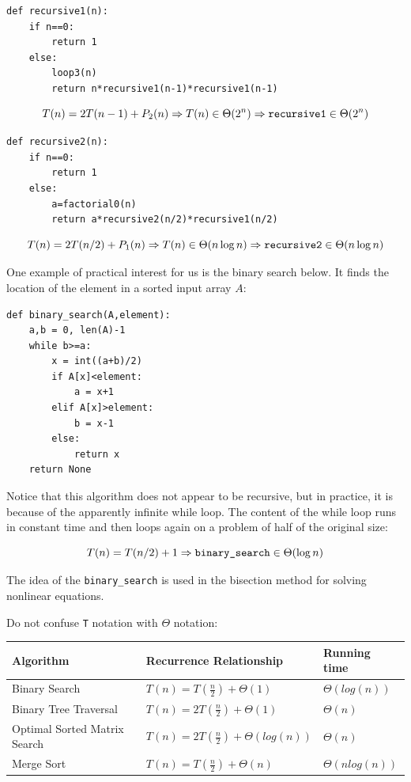 \documentclass[justified,sixbynine]{tufte-book}
\def\ft{\small\tt}
\theoremstyle{plain}%
\theoremstyle{definition}
\theoremstyle{remark}
\begin{document}
\begin{fullwidth}
\begin{lstlisting}
def recursive1(n):
    if n==0:
        return 1
    else:
        loop3(n)
        return n*recursive1(n-1)*recursive1(n-1)
\end{lstlisting}

\begin{equation}
T(n)=2T(n-1)+P_2(n)\Rightarrow T(n)\in \Theta (2^n)\Rightarrow \text{{\tt %
recursive1}}\in \Theta (2^n)
\end{equation}

\begin{lstlisting}
def recursive2(n):
    if n==0:
        return 1
    else:
        a=factorial0(n)
        return a*recursive2(n/2)*recursive1(n/2)
\end{lstlisting}

\begin{equation}
T(n)=2T(n/2)+P_1(n)\Rightarrow T(n)\in \Theta (n\log n)\Rightarrow \text{%
{\tt recursive2}}\in \Theta (n\log n)
\end{equation}

One example of practical interest for us is the binary search below. It finds the location of the element in a sorted input array $A$:

\begin{lstlisting}
def binary_search(A,element):
    a,b = 0, len(A)-1
    while b>=a:
        x = int((a+b)/2)
        if A[x]<element:
            a = x+1
        elif A[x]>element:
            b = x-1
        else:
            return x
    return None
\end{lstlisting}

Notice that this algorithm does not appear to be recursive, but in practice, it is because of the apparently infinite while loop. The content of the while loop runs in constant time and then loops again on a problem of half of the original size:

\begin{equation}
T(n)=T(n/2)+1\Rightarrow \text{{\tt binary\_search}}\in \Theta(\log n)
\end{equation}

The idea of the {\ft binary\_search} is used in the bisection method for solving nonlinear equations.

Do not confuse {\ft T} notation with $\Theta$ notation:

\begin{table}
\begin{tabular}{|l|l|l|}\hline
Algorithm & Recurrence Relationship & Running time \\ \hline
Binary Search & $T(n) = T(\frac n 2) + \Theta (1)$ & $\Theta(log(n))$ \\ \hline
Binary Tree Traversal & $T(n) = 2T(\frac n 2) + \Theta (1)$ & $\Theta(n)$ \\ \hline
Optimal Sorted Matrix Search & $T(n) = 2T(\frac n 2) + \Theta (log(n))$ & $\Theta(n)$ \\ \hline
Merge Sort & $T(n) = T(\frac n 2) + \Theta (n)$ & $\Theta(n log(n))$ \\ \hline
\end{tabular}
\label{table1}
\end{table}


\end{fullwidth}
\end{document}
